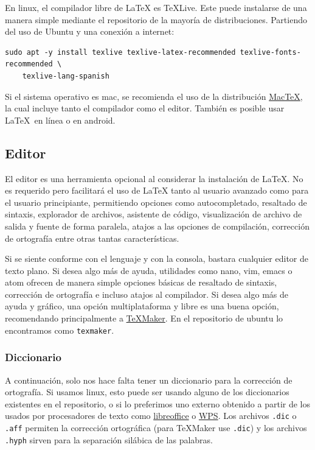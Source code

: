 \documentclass[12pt]{article}
\begin{document}
En linux, el compilador libre de LaTeX es TeXLive. Este puede instalarse de una manera simple mediante el repositorio de la mayoría de distribuciones. Partiendo del uso de Ubuntu y una conexión a internet:

\begin{verbatim}
sudo apt -y install texlive texlive-latex-recommended texlive-fonts-recommended \
    texlive-lang-spanish
\end{verbatim}

Si el sistema operativo es mac, se recomienda el uso de la distribución \href{http://tug.org/mactex/}{MacTeX}, la cual incluye tanto el compilador como el editor.
También es posible usar \LaTeX \ en línea o en android.

\subsection{Editor}

El editor es una herramienta opcional al considerar la instalación de LaTeX. No es requerido pero facilitará el uso de LaTeX tanto al usuario avanzado como para el usuario principiante, permitiendo opciones como autocompletado, resaltado de sintaxis, explorador de archivos, asistente de código, visualización de archivo de salida y fuente de forma paralela, atajos a las opciones de compilación, corrección de ortografía entre otras tantas características.  

Si se siente conforme con el lenguaje y con la consola, bastara cualquier editor de texto plano. Si desea algo más de ayuda, utilidades como nano, vim, emacs o atom ofrecen de manera simple opciones básicas de resaltado de sintaxis, corrección de ortografía e incluso atajos al compilador. Si desea algo más de ayuda y gráfico, una opción multiplataforma y libre es una buena opción, recomendando principalmente a \href{http://www.xm1math.net/texmaker/}{TeXMaker}. En el repositorio de ubuntu lo encontramos como \verb-texmaker-.

\subsubsection{Diccionario}

A continuación, solo nos hace falta tener un diccionario para la corrección de ortografía. Si usamos linux, esto puede ser usando alguno de los diccionarios existentes en el repositorio, o si lo preferimos uno externo obtenido a partir de los usados por procesadores de texto como \href{https://www.dropbox.com/sh/y45katzvdjrl7nl/AAAwM89aDOJ_jA_Py3DdFJN8a?dl=0}{libreoffice} o \href{https://www.dropbox.com/sh/y45katzvdjrl7nl/AAAwM89aDOJ_jA_Py3DdFJN8a?dl=0}{WPS}. Los archivos \verb-.dic- o \verb-.aff- permiten la corrección ortográfica (para TeXMaker use \verb-.dic-) y los archivos \verb-.hyph- sirven para la separación silábica de las palabras.
\end{document}
